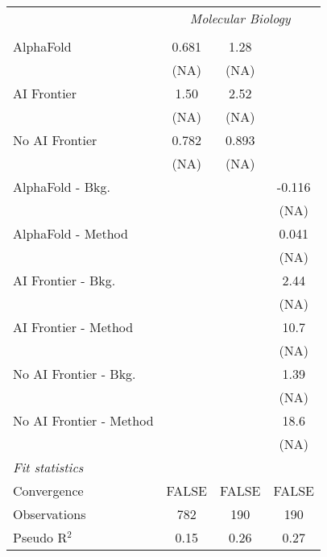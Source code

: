 \begin{tabular}{lccc}
 & \multicolumn{3}{c}{\textit{Molecular Biology}} \\ \\
   AlphaFold               & 0.681 & 1.28  &   \\   
                           & (NA)  & (NA)  &   \\   
   AI Frontier             & 1.50  & 2.52  &   \\   
                           & (NA)  & (NA)  &   \\   
   No AI Frontier          & 0.782 & 0.893 &   \\   
                           & (NA)  & (NA)  &   \\   
   AlphaFold - Bkg.        &       &       & -0.116\\   
                           &       &       & (NA)\\   
   AlphaFold - Method      &       &       & 0.041\\   
                           &       &       & (NA)\\   
   AI Frontier - Bkg.      &       &       & 2.44\\   
                           &       &       & (NA)\\   
   AI Frontier - Method    &       &       & 10.7\\   
                           &       &       & (NA)\\   
   No AI Frontier - Bkg.   &       &       & 1.39\\   
                           &       &       & (NA)\\   
   No AI Frontier - Method &       &       & 18.6\\   
                           &       &       & (NA)\\   
   \midrule
   \emph{Fit statistics}\\
   Convergence             &FALSE  & FALSE & FALSE\\  
   Observations            & 782   & 190   & 190\\  
   Pseudo R$^2$            & 0.15  & 0.26  & 0.27\\  
   

\end{tabular}
